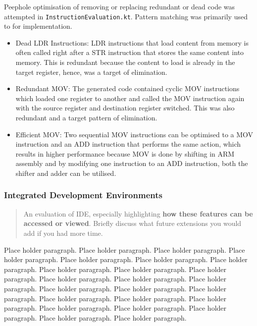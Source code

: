 \documentclass[a4paper,12pt]{article}
\newcommand{\shell}[1]{\lstinline!#1!}
\begin{document}
Peephole optimisation of removing or replacing redundant or dead code was attempted in \shell{InstructionEvaluation.kt}. Pattern matching was primarily used to for implementation.

\begin{itemize}
\item{Dead LDR Instructions: LDR instructions that load content from memory is often called right after a STR instruction that stores the same content into memory. This is redundant because the content to load is already in the target register, hence, was a target of elimination.}

\item{Redundant MOV: The generated code contained cyclic MOV instructions which loaded one register to another and called the MOV instruction again with the source register and destination register switched. This was also redundant and a target pattern of elimination.}

\item{Efficient MOV: Two sequential MOV instructions can be optimised to a MOV instruction and an ADD instruction that performs the same action, which results in higher performance because MOV is done by shifting in ARM assembly and by modifying one instruction to an ADD instruction, both the shifter and adder can be utilised.}
\end{itemize}

\subsubsection*{Integrated Development Environments}

\begin{quote}
     An evaluation of IDE, especially highlighting \textbf{how these features can be accessed or viewed}. Briefly discuss what future extensions you would add if you had more time.
\end{quote}

Place holder paragraph. Place holder paragraph. Place holder paragraph. Place holder paragraph. Place holder paragraph. Place holder paragraph. Place holder paragraph. Place holder paragraph. Place holder paragraph. Place holder paragraph. Place holder paragraph. Place holder paragraph. Place holder paragraph. Place holder paragraph. Place holder paragraph. Place holder paragraph. Place holder paragraph. Place holder paragraph. Place holder paragraph. Place holder paragraph. Place holder paragraph. Place holder paragraph. Place holder paragraph. Place holder paragraph. 
\end{document}
